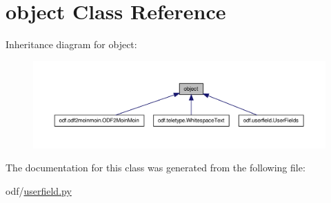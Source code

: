 \hypertarget{classobject}{\section{object Class Reference}
\label{classobject}
}


Inheritance diagram for object\+:
\nopagebreak
\begin{figure}[H]
\begin{center}
\leavevmode
\includegraphics[width=350pt]{classobject__inherit__graph}
\end{center}
\end{figure}


The documentation for this class was generated from the following file\+:\begin{DoxyCompactItemize}
\item 
odf/\hyperlink{userfield_8py}{userfield.\+py}\end{DoxyCompactItemize}
